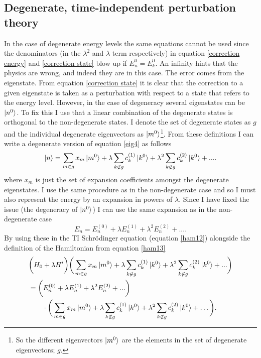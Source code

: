 \subsection*{Degenerate, time-independent perturbation theory}
In the case of degenerate energy levels the same equations cannot be used since the denominators (in the $\lambda^2
$ and $\lambda$ term respectively) in equation \eqref{correction energy} and \eqref{correction state} blow up if $E_n^0=E_k^0$. An infinity hints that the physics are wrong, and indeed they are in this case. The error comes from the eigenstate. From equation \eqref{correction state} it is clear that the correction to a given eigenstate is taken as a perturbation with respect to a state that refers to the energy level. However, in the case of degeneracy several eigenstates can be $\ket{n^0}$. To fix this I use that a linear combination of the degenerate states is orthogonal to the non-degenerate states. I denote the set of degenerate states as $g$ and the individual degenerate eigenvectors as $\ket{m^0}$\footnote{So the different eigenvectors $\ket{m^0}$ are the elements in the set of degenerate eigenvectors; $g$.}. From these definitions I can write a degenerate version of equation \eqref{eig4} as follows
\begin{equation}
	\ket{n}=\sum_{m\in g}x_m\ket{m^0}+\lambda\sum_{k\not\in g}c_k^{(1)}\ket{k^0}+\lambda^2\sum_{k\not\in g}c_k^{(2)}\ket{k^0}+....
	\label{correction state1}
\end{equation} 
where $x_m$ is just the set of expansion coefficients amongst the degenerate eigenstates. I use the same procedure as in the non-degenerate case and so I must also represent the energy by an expansion in powers of $\lambda$. Since I have fixed the issue (the degeneracy of $\ket{n^0}$) I can use the same expansion as in the non-degenerate case
\begin{equation}
	E_n=E_n^{(0)}+\lambda E_n^{(1)}+\lambda^2E_n^{(2)}+....
\end{equation} 
By using these in the TI Schrödinger equation (equation \eqref{ham12}) alongside the definition of the Hamiltonian from equation \eqref{ham13}
\begin{equation}
	\begin{split}
		&\bigg(H_0+\lambda H'\bigg)\bigg(\sum_{m\in g}x_m\ket{m^0}+\lambda\sum_{k\not\in g}c_k^{(1)}\ket{k^0}+\lambda^2\sum_{k\not\in g}c_k^{(2)}\ket{k^0}+...\bigg)\\
		&=\bigg(E_n^{(0)}+\lambda E_n^{(1)}+\lambda^2E_n^{(2)}+...\bigg)\\
		&\qquad\cdot\bigg(\sum_{m\in g}x_m\ket{m^0}+\lambda\sum_{k\not\in g}c_k^{(1)}\ket{k^0}+\lambda^2\sum_{k\not\in g}c_k^{(2)}\ket{k^0}+\dots\bigg).
	\end{split}
\end{equation} 
